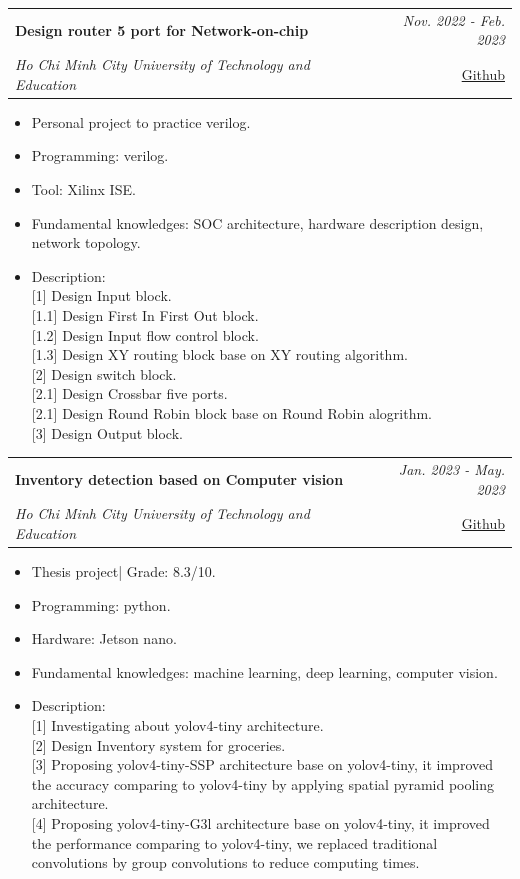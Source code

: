 \documentclass[a4paper,11pt]{article}
\makeatletter
\newcommand{\resumeProject}[4]{
\vspace{0.5mm}\item
    \begin{tabular*}{0.98\textwidth}[t]{l@{\extracolsep{\fill}}r}
        \textbf{#1} & \textit{\footnotesize{#3}} \\
        \footnotesize{\textit{#2}} & \footnotesize{#4}
    \end{tabular*}
    \vspace{-2.4mm}
}
\newcommand{\resumeItemListStart}{\begin{justify}\begin{itemize}[leftmargin=3ex, rightmargin=2ex, noitemsep,labelsep=1.2mm,itemsep=0mm]\small}
\newcommand{\resumeItemListEnd}{\end{itemize}\end{justify}\vspace{-2mm}}
\makeatother
\begin{document}
    \resumeProject
    {Design router 5 port for Network-on-chip}
    {Ho Chi Minh City University of Technology and Education}
    {Nov. 2022 - Feb. 2023}{\href{https://github.com/Winxkin/Noc_prj}{Github}}
    \resumeItemListStart
    \item {Personal project to practice verilog.}
    \item {Programming: verilog.}
    \item {Tool: Xilinx ISE.}
    \item {Fundamental knowledges: SOC architecture, hardware description design, network topology.}
    \item {Description:}\hfill
    \\ {[1] Design Input block.}
    \\ {[1.1] Design First In First Out block.}
    \\ {[1.2] Design Input flow control block.}
    \\ {[1.3] Design XY routing block base on XY routing algorithm.}
    \\ {[2] Design switch block.}
    \\ {[2.1] Design Crossbar five ports.}
    \\ {[2.1] Design Round Robin block base on Round Robin alogrithm.}
    \\ {[3] Design Output block.}

  \resumeItemListEnd

    \resumeProject
      {Inventory detection based on Computer vision}
      {Ho Chi Minh City University of Technology and Education}
      {Jan. 2023 - May. 2023}
      {\href{https://github.com/Winxkin/Inventory_detection_thesis}{Github}}
      \resumeItemListStart
        \item {Thesis project| Grade: 8.3/10.}
        \item {Programming: python.}
        \item {Hardware: Jetson nano.}
        \item {Fundamental knowledges: machine learning, deep learning, computer vision.}
        \item {Description: }\hfill
        \\ {[1] Investigating about yolov4-tiny architecture.}
        \\ {[2] Design Inventory system for groceries.}
        \\ {[3] Proposing yolov4-tiny-SSP architecture base on yolov4-tiny, it improved the accuracy comparing to yolov4-tiny by applying spatial pyramid pooling architecture.}
        \\ {[4] Proposing yolov4-tiny-G3l architecture base on yolov4-tiny, it improved the performance comparing to yolov4-tiny, we replaced traditional convolutions by group convolutions to reduce computing times.}
    \resumeItemListEnd
\end{document}
